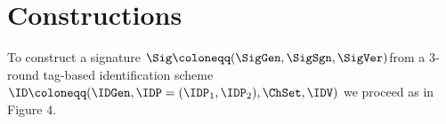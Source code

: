 \section{Constructions}

\begin{definition} To construct a signature $\Sig \coloneqq (\SigGen, \SigSgn,
\SigVer )$from a 3-round tag-based identification scheme  $\ID \coloneqq(\IDGen, \IDP=(\IDP_1,\IDP_2) ,\ChSet, \IDV)$ we proceed as in Figure 4.

\begin{center}
\begin{figure}[htb!]
    \nicoresetlinenr
\end{figure}
\end{center}
\end{definition}
